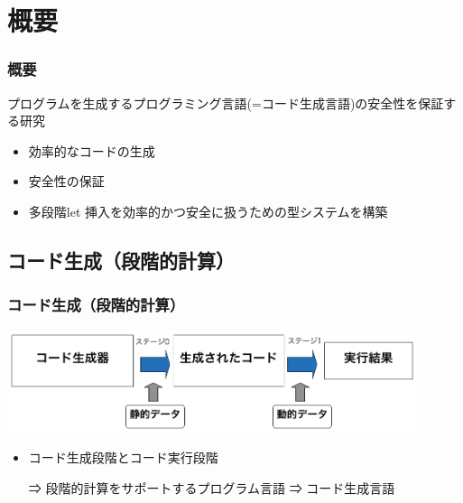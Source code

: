 
\section{概要}

\begin{frame}
  \frametitle{概要}
  プログラムを生成するプログラミング言語(=\alert{コード生成言語})の安全性を保証する研究
  \begin{itemize}
  \item<2-> 効率的なコードの生成
  \item<2-> 安全性の保証
  \item<3-> [⇒] \alert{多段階let 挿入}を効率的かつ安全に扱うための型システムを構築
  \end{itemize}
\end{frame}

\subsection{コード生成（段階的計算）}
\begin{frame}
  \frametitle{コード生成（段階的計算）}
  \includegraphics[clip,width=12cm]{./img/prggen.png}
  \begin{itemize}
  \item コード生成段階とコード実行段階
  \item[⇒] 段階的計算をサポートするプログラム言語 ⇒ コード生成言語
  \end{itemize}
\end{frame}

